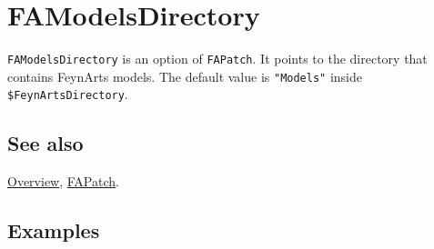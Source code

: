 \documentclass[../FeynCalcManual.tex]{subfiles}
\begin{document}
\hypertarget{famodelsdirectory}{
\section{FAModelsDirectory}\label{famodelsdirectory}}

\texttt{FAModelsDirectory} is an option of \texttt{FAPatch}. It points
to the directory that contains FeynArts models. The default value is
\texttt{"Models"} inside \texttt{\$FeynArtsDirectory}.

\subsection{See also}

\hyperlink{toc}{Overview}, \hyperlink{fapatch}{FAPatch}.

\subsection{Examples}
\end{document}
